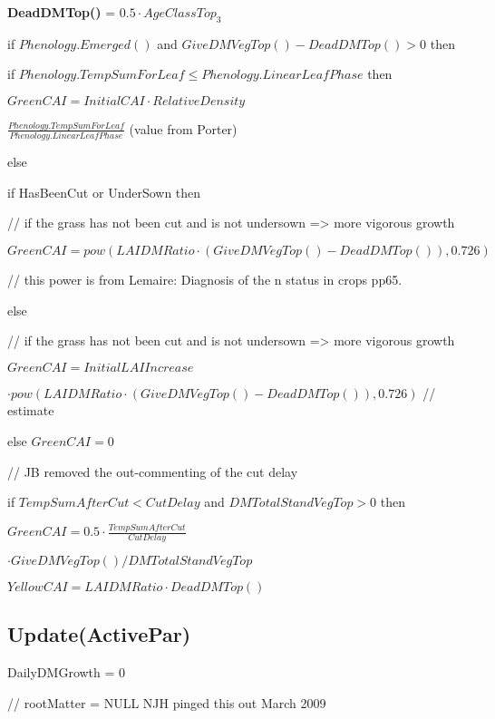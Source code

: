 \documentclass[%
]{scrartcl}
\begin{document}
\textbf{DeadDMTop()} = $ 0.5 \cdot AgeClassTop_3$

   if $Phenology.Emerged()$  and  $GiveDMVegTop()-DeadDMTop()>0$ then
	
\quad   	   if $Phenology.TempSumForLeaf \le Phenology.LinearLeafPhase$ then

 \quad  \quad      $GreenCAI =  InitialCAI \cdot RelativeDensity$ 

\quad  \quad \quad  \quad   $\tfrac{Phenology.TempSumForLeaf}{Phenology.LinearLeafPhase} $  (value from Porter)
    
  else
     

\quad    \quad     if HasBeenCut  or  UnderSown then  

\quad    \quad    \quad   //  if the grass has not been cut and is not undersown => more vigorous growth

 \quad   \quad   \quad  $ GreenCAI  = pow(LAIDMRatio \cdot (GiveDMVegTop()-DeadDMTop()),0.726)  $ 
  
 \quad   \quad   \quad // this power is from Lemaire: Diagnosis of the n status in crops pp65.

\quad     \quad          else     
                        
\quad     \quad  //  if the grass has not been cut and is not undersown => more vigorous growth

  \quad   \quad   \quad            $ GreenCAI  = InitialLAIIncrease $

\quad   \quad   \quad $\cdot pow(LAIDMRatio \cdot (GiveDMVegTop()-DeadDMTop()),0.726) $    //  estimate

  

   else
\quad   	   $GreenCAI = 0$

   //  JB removed the out-commenting of the cut delay

   if $TempSumAfterCut<CutDelay$  and  $DMTotalStandVegTop>0$ then

 \quad     	$GreenCAI = 0.5 \cdot \tfrac{TempSumAfterCut}{CutDelay}$

\quad \quad  $\cdot GiveDMVegTop()/DMTotalStandVegTop$

   $YellowCAI = LAIDMRatio \cdot DeadDMTop()$


\subsection{Update(ActivePar)}

   DailyDMGrowth = 0

//    rootMatter = NULL    NJH pinged this out March 2009
	
\end{document}
